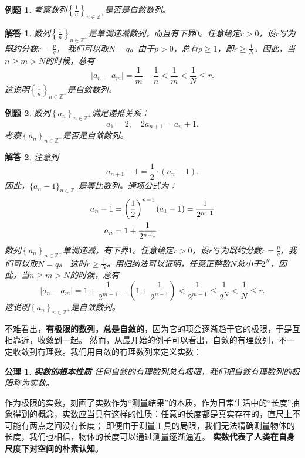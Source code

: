 \documentclass[12pt,UTF8]{ctexbook}
\newtheorem{et}{例题}[section]
\newtheorem*{po}{公理}
\newtheorem*{so}{解答}
\begin{document}
\begin{et} 
    考察数列$\left\{\frac{1}{n}\right\}_{n\in\mathbb{Z}^+}$是否是自敛数列。\\
\end{et}
\begin{so}
    数列$\left\{\frac{1}{n}\right\}_{n\in\mathbb{Z}^+}$是单调递减数列，而且有下界$0$。任意给定$r>0$，设$r$写为既约分数$r = \frac{p}{q}$，
    我们可以取$N = q$。由于$p > 0$，总有$p \geqslant 1$，即$r \geqslant \frac{1}{N}$。因此，当$n\geqslant m>N$的时候，总有
    $$|a_n - a_m| = \frac{1}{m} - \frac{1}{n} < \frac{1}{m} < \frac{1}{N} \leqslant r.$$
    这说明$\left\{\frac{1}{n}\right\}_{n\in\mathbb{Z}^+}$是自敛数列。
\end{so}
\begin{et} 
    数列$\left\{a_n\right\}_{n\in\mathbb{Z}^+}$满足递推关系：
    $$a_1 = 2, \quad 2a_{n+1} = a_n + 1.$$
    \indent 考察$\left\{a_n\right\}_{n\in\mathbb{Z}^+}$是否是自敛数列。\\
\end{et}
\begin{so}
    注意到
    $$ a_{n+1} - 1 = \frac{1}{2}\cdot (a_n - 1). $$
    因此，$\{a_n - 1\}_{n\in\mathbb{Z}^+}$是等比数列。通项公式为：
    \begin{align}
        a_n - 1 &= \left(\frac12\right)^{n-1} (a_1 - 1) = \frac{1}{2^{n-1}} \notag \\
        a_n &= 1 + \frac{1}{2^{n-1}} \notag
    \end{align}
    数列$\left\{a_n\right\}_{n\in\mathbb{Z}^+}$单调递减，有下界$1$。任意给定$r>0$，设$r$写为既约分数$r = \frac{p}{q}$，我们可以取$N = q$。
    这时$r \geqslant \frac{1}{N}$。用归纳法可以证明，任意正整数$N$总小于$2^N$，因此，当$n\geqslant m>N$的时候，总有
    $$|a_n - a_m| = 1 + \frac{1}{2^{m-1}} - \left(1 + \frac{1}{2^{n-1}} \right) < \frac{1}{2^{m-1}} \leqslant \frac{1}{2^N} < \frac{1}{N} \leqslant r.$$
    这说明$\left\{a_n\right\}_{n\in\mathbb{Z}^+}$是自敛数列。
\end{so}

不难看出，\textbf{有极限的数列，总是自敛的}，因为它的项会逐渐趋于它的极限，于是互相靠近，收敛到一起。
然而，从最开始的例子可以看出，自敛的有理数列，不一定收敛到有理数。我们用自敛的有理数列来定义实数：
\begin{po}\textbf{实数的根本性质}
    任何自敛的有理数列总有极限，我们把自敛有理数列的极限称为实数。
\end{po}

作为极限的实数，刻画了实数作为“测量结果”的本质。作为日常生活中的“长度”抽象得到的概念，实数应当具有这样的性质：任意的长度都是真实存在的，直尺上不可能有两点之间没有长度；
即便由于测量工具的局限，我们无法精确测量物体的长度，我们也相信，物体的长度可以通过测量逐渐逼近。
\textbf{实数代表了人类在自身尺度下对空间的朴素认知}。
\end{document}
